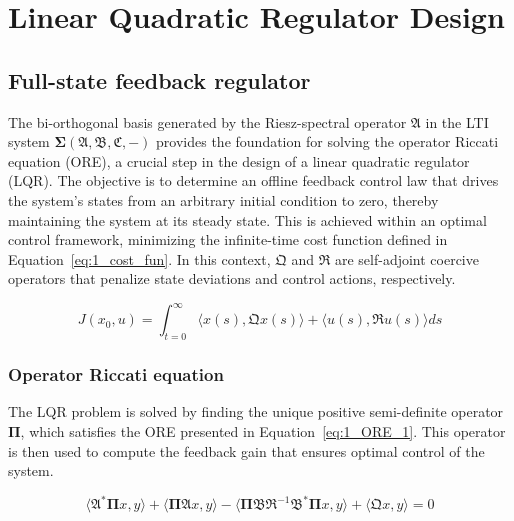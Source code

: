 \section{Linear Quadratic Regulator Design} \label{sec:1_control}

\subsection{Full-state feedback regulator} \label{sec:1_fullstate_design}

The bi-orthogonal basis generated by the Riesz-spectral operator $\mathfrak{A}$ in the LTI system $\mathbf{\Sigma(\mathfrak{A},\mathfrak{B},\mathfrak{C},-)}$ provides the foundation for solving the operator Riccati equation (ORE), a crucial step in the design of a linear quadratic regulator (LQR). The objective is to determine an offline feedback control law that drives the system's states from an arbitrary initial condition to zero, thereby maintaining the system at its steady state. This is achieved within an optimal control framework, minimizing the infinite-time cost function defined in Equation~\ref{eq:1_cost_fun}. In this context, $\mathfrak{Q}$ and $\mathfrak{R}$ are self-adjoint coercive operators that penalize state deviations and control actions, respectively.

\begin{equation} \label{eq:1_cost_fun}
    J({x_0}, u) = \int_{t=0}^{\infty} \langle {x}(s), \mathfrak{Q} {x}(s)\rangle + \langle u(s), \mathfrak{R} u(s)\rangle ds
\end{equation}

\subsubsection{Operator Riccati equation}

The LQR problem is solved by finding the unique positive semi-definite operator $\mathbf{\Pi}$, which satisfies the ORE presented in Equation~\ref{eq:1_ORE_1}. This operator is then used to compute the feedback gain that ensures optimal control of the system.

\begin{equation} \label{eq:1_ORE_1}
    \langle \mathfrak{A}^* \mathbf{\Pi} {x}, {y}\rangle + \langle \mathbf{\Pi} \mathfrak{A} {x}, {y} \rangle - \langle \mathbf{\Pi} \mathfrak{B} \mathfrak{R}^{-1} \mathfrak{B}^* \mathbf{\Pi} {x}, {y}\rangle + \langle \mathfrak{Q} {x}, {y}\rangle = 0
\end{equation}

